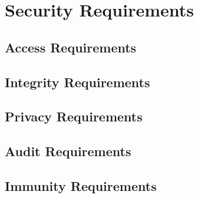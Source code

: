 \section{Security Requirements}
\subsection{Access Requirements}
\subsection{Integrity Requirements}
\subsection{Privacy Requirements}
\subsection{Audit Requirements}
\subsection{Immunity Requirements}